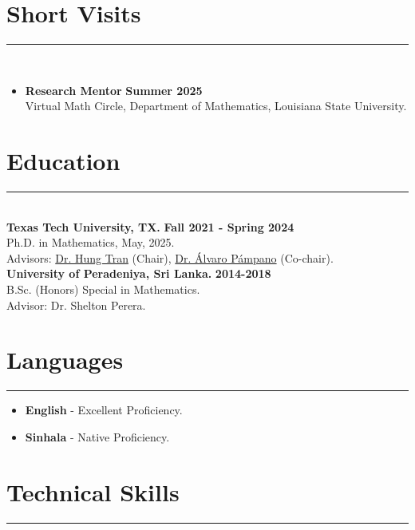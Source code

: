 \documentclass[12pt]{book}
\begin{document}
\section*{Short Visits}  \rule{\textwidth}{1pt}\\

\begin{itemize}
	\item \textbf{Research Mentor} \hfill \textbf{Summer 2025}\\
Virtual Math Circle, Department of Mathematics, Louisiana State University.
\end{itemize}


\section*{Education} \rule{\textwidth}{1pt}\\

\noindent \textbf{Texas Tech University, TX.} \hfill \textbf{Fall 2021 - Spring 2024}\\
Ph.D. in Mathematics, May, 2025. \\
Advisors:  \href{https://www.myweb.ttu.edu/tra97432/}{Dr. Hung Tran} (Chair), \href{https://www.math.ttu.edu/~apampano/}{Dr. \'Alvaro P\'ampano} (Co-chair).\\

\noindent \textbf{University of Peradeniya, Sri Lanka.} \hfill \textbf{2014-2018}\\
B.Sc. (Honors) Special in Mathematics. \\
Advisor: Dr. Shelton Perera. 

\section*{Languages}
\rule{\textwidth}{1pt}
\begin{itemize}
	\item \textbf{English} - Excellent Proficiency.
	\item \textbf{Sinhala} - Native Proficiency. 
\end{itemize}


\section*{Technical Skills}
\rule{\textwidth}{1pt}\\
\end{document}
